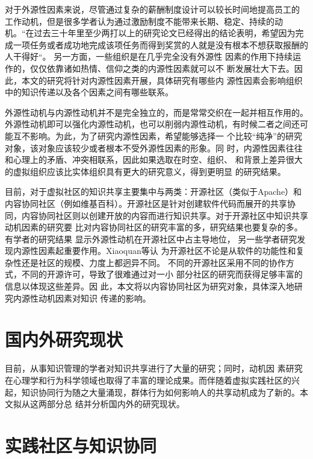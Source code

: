 \documentclass[12pt,a4paper]{ctexart}
\begin{document}
对于外源性因素来说，尽管通过复杂的薪酬制度设计可以较长时间地提高员工的
工作动机，但是很多学者认为通过激励制度不能带来长期、稳定、持续的动机。“在过去三十年里至少两打以上的研究论文已经得出的结论表明，希望因为完成一项任务或者成功地完成该项任务而得到奖赏的人就是没有根本不想获取报酬的人干得好“\cite{93120316461993}。
另一方面，一些组织是在几乎完全没有外源性
因素的作用下持续运作的，仅仅依靠诸如热情、信仰之类的内源性因素就可以不
断发展壮大下去。因此，本文的研究将针对内源性因素开展，具体研究有哪些内
源性因素会影响组织中的知识传递以及各个因素之间有哪些联系。

外源性动机与内源性动机并不是完全独立的，而是常常交织在一起并相互作用的。
外源性动机即可以强化内源性动机，也可以削弱内源性动机，有时候二者之间还可
能互不影响\cite{deci1971eem}。为此，为了研究内源性因素，希望能够选择一
个比较“纯净”的研究对象，该对象应该较少或者根本不受外源性因素的形象。同
时，内源性因素往往和心理上的矛盾、冲突相联系，因此如果选取在时空、组织、
和背景上差异很大的虚拟组织应该比实体组织具有更大的研究意义，得到更明显
的研究结果。

目前，对于虚拟社区的知识共享主要集中与两类：开源社区（类似于Apache）和
内容协同社区（例如维基百科）。开源社区是针对创建软件代码而展开的共享协
同，内容协同社区则以创建开放的内容而进行知识共享。对于开源社区中知识共享动机因素的研究要
比对内容协同社区的研究丰富的多，研究结果也要复杂的多。有学者的研究结果
显示外源性动机在开源社区中占主导地位\cite{10.1109/HICSS.2001.927045}，
另一些学者研究发现内源性因素起重要作用\cite{Lakhani2003}。Xiaoquan等认
为开源社区不论是从软件的功能性和复杂性还是社区的规模、力度上都迥异不同。
不同的开源社区采用不同的协作方式，不同的开源许可，导致了很难通过对一小
部分社区的研究而获得足够丰富的信息以体现这些差异\cite{Zhang2006}。因
此，本文将以内容协同社区为研究对象，具体深入地研究内源性动机因素对知识
传递的影响。


\section{国内外研究现状}
目前，从事知识管理的学者对知识共享进行了大量的研究；同时，动机因
素研究在心理学和行为科学领域也取得了丰富的理论成果。而伴随着虚拟实践社区的兴
起，知识协同行为随之大量涌现，群体行为如何影响人的共享动机成为了新的。本文拟从这两部分总
结并分析国内外的研究现状。



\section{实践社区与知识协同}
\end{document}
